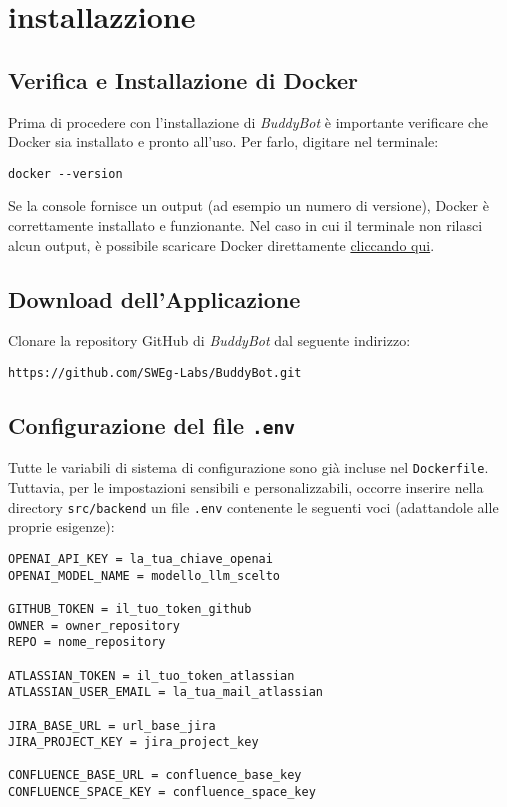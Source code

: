

\section{installazzione}
\label{sec:installazzione}

\subsection{Verifica e Installazione di Docker}
Prima di procedere con l'installazione di \textit{BuddyBot} è importante verificare che Docker sia installato e pronto all'uso.  
Per farlo, digitare nel terminale:
\begin{verbatim}
docker --version
\end{verbatim}
Se la console fornisce un output (ad esempio un numero di versione), Docker è correttamente installato e funzionante.  
Nel caso in cui il terminale non rilasci alcun output, è possibile scaricare Docker direttamente 
\href{https://www.docker.com/products/docker-desktop}{cliccando qui}.

\subsection{Download dell'Applicazione}
Clonare la repository GitHub di \textit{BuddyBot} dal seguente indirizzo:
\begin{verbatim}
https://github.com/SWEg-Labs/BuddyBot.git
\end{verbatim}

\subsection{Configurazione del file \texttt{.env}}
Tutte le variabili di sistema di configurazione sono già incluse nel \texttt{Dockerfile}.  
Tuttavia, per le impostazioni sensibili e personalizzabili, occorre inserire nella directory \texttt{src/backend} un file \texttt{.env} contenente le seguenti voci (adattandole alle proprie esigenze):
\begin{verbatim}
OPENAI_API_KEY = la_tua_chiave_openai
OPENAI_MODEL_NAME = modello_llm_scelto

GITHUB_TOKEN = il_tuo_token_github
OWNER = owner_repository
REPO = nome_repository

ATLASSIAN_TOKEN = il_tuo_token_atlassian
ATLASSIAN_USER_EMAIL = la_tua_mail_atlassian

JIRA_BASE_URL = url_base_jira
JIRA_PROJECT_KEY = jira_project_key

CONFLUENCE_BASE_URL = confluence_base_key
CONFLUENCE_SPACE_KEY = confluence_space_key
\end{verbatim}

